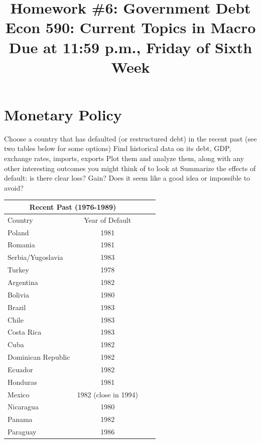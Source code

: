 \documentclass[a4paper]{article}
\title{{\Large \bf Homework \#6: Government Debt} \\ \small Econ 590: Current Topics in Macro \\ \small Due at  11:59 p.m., Friday of Sixth Week}
\date{}
\renewcommand{\item}{\itemindent1cm\itemold}
\begin{document}
\maketitle
 
\noindent

\section*{Monetary Policy}
\begin{itemize}
\item Choose a country that has defaulted (or restructured debt) in the recent past (see two tables below for some options)
\item Find historical data on its debt, GDP, exchange rates, imports, exports
\item Plot them and analyze them, along with any other interesting outcomes you might think of to look at
\item Summarize the effects of default: is there clear loss?  Gain?  Does it seem like a good idea or impossible to avoid? 
\end{itemize}

\begin{table}
\centering
\begin{tabular}{lccc}
\hline
\multicolumn{2}{c}{Recent Past (1976-1989)}\\
\hline\hline
Country & Year of Default \\
\hline
Poland & 1981\\
Romania & 1981\\
Serbia/Yugoslavia & 1983\\
Turkey & 1978\\
Argentina & 1982\\
Bolivia & 1980\\
Brazil & 1983\\
Chile & 1983\\
Costa Rica & 1983\\
Cuba & 1982\\
Dominican Republic & 1982\\
Ecuador & 1982\\
Honduras & 1981\\
Mexico & 1982 (close in 1994)\\
Nicaragua & 1980\\
Panama & 1982\\
Paraguay & 1986\\
\hline\hline
\end{tabular}
\end{table}
\end{document}
